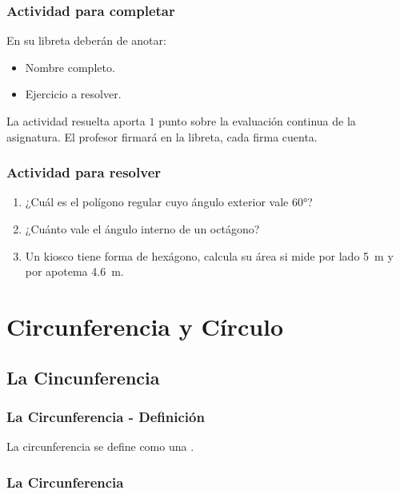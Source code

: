 \documentclass[14pt]{beamer}
\begin{document}
\begin{frame}
\frametitle{Actividad para completar}
En su libreta deberán de anotar:
\begin{itemize}
\item Nombre completo.
\item Ejercicio a resolver.
\end{itemize}
La actividad resuelta aporta $1$ punto sobre la evaluación continua de la asignatura. El profesor firmará en la libreta, cada firma cuenta.
\end{frame}
\begin{frame}
\frametitle{Actividad para resolver}
\begin{enumerate}[<+->]
\item ¿Cuál es el polígono regular cuyo ángulo exterior vale \ang{60}?
\item ¿Cuánto vale el ángulo interno de un octágono?
\item Un kiosco tiene forma de hexágono, calcula su área si mide por lado \SI{5}{\meter} y por apotema \SI{4.6}{\meter}.
\end{enumerate}
\end{frame}

\section{Circunferencia y Círculo}
\subsection{La Cincunferencia}

\begin{frame}
\frametitle{La Circunferencia - Definición}
La circunferencia se define como una .
\end{frame}
\begin{frame}
\frametitle{La Circunferencia}
\begin{figure}
    \centering
\end{figure}
\end{frame}
\end{document}
